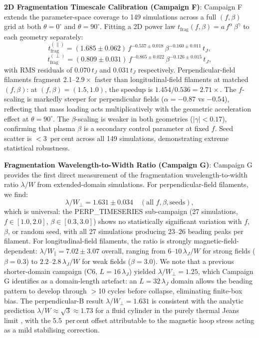 \documentclass[usenatbib]{rasti}
\begin{document}
\textbf{2D Fragmentation Timescale Calibration (Campaign F)}: Campaign F extends the
parameter-space coverage to 149 simulations across a full $(f, \beta)$ grid at both
$\theta = 0^\circ$ and $\theta = 90^\circ$. Fitting a 2D power law
$t_\mathrm{frag}(f, \beta) = a\,f^{\alpha}\,\beta^{\gamma}$ to each geometry separately:
\begin{equation}
t_\mathrm{frag}^{(\parallel)} = (1.685 \pm 0.062)\,f^{-0.537 \pm 0.018}\,\beta^{-0.160 \pm 0.011}\,t_J,
\label{eq:tfrag_para}
\end{equation}
\begin{equation}
t_\mathrm{frag}^{(\perp)} = (0.809 \pm 0.031)\,f^{-0.865 \pm 0.022}\,\beta^{-0.126 \pm 0.015}\,t_J,
\label{eq:tfrag_perp}
\end{equation}
with RMS residuals of $0.070\,t_J$ and $0.031\,t_J$ respectively. Perpendicular-field
filaments fragment 2.1--$2.9\times$ faster than longitudinal-field filaments at matched
$(f, \beta)$: at $(f, \beta) = (1.5, 1.0)$, the speedup is $1.454/0.536 = 2.71\times$. The
$f$-scaling is markedly steeper for perpendicular fields ($\alpha = -0.87$ vs $-0.54$),
reflecting that mass loading acts multiplicatively with the geometric acceleration effect at
$\theta = 90^\circ$. The $\beta$-scaling is weaker in both geometries ($|\gamma| < 0.17$),
confirming that plasma $\beta$ is a secondary control parameter at fixed $f$. Seed
scatter is $< 3$~per\,cent across all 149 simulations, demonstrating extreme statistical
robustness.

\textbf{Fragmentation Wavelength-to-Width Ratio (Campaign G)}: Campaign G provides the
first direct measurement of the fragmentation wavelength-to-width ratio $\lambda/W$ from
extended-domain simulations. For perpendicular-field filaments, we find:
\begin{equation}
\lambda/W_\perp = 1.631 \pm 0.034 \quad (\text{all } f, \beta, \text{seeds}),
\label{eq:lw_perp}
\end{equation}
which is universal: the PERP\_TIMESERIES sub-campaign (27 simulations, $f \in [1.0, 2.0]$,
$\beta \in [0.3, 3.0]$) shows no statistically significant variation with $f$, $\beta$, or
random seed, with all 27 simulations producing $23$--$26$ beading peaks per filament. For
longitudinal-field filaments, the ratio is strongly magnetic-field-dependent:
$\lambda/W_\parallel = 7.02 \pm 3.07$ overall, ranging from $6$--$10\,\lambda_J/W$ for strong
fields ($\beta = 0.3$) to $2.2$--$2.8\,\lambda_J/W$ for weak fields ($\beta = 3.0$). We note that
a previous shorter-domain campaign (C6, $L = 16\,\lambda_J$) yielded $\lambda/W_\perp = 1.25$,
which Campaign G identifies as a domain-length artefact: an $L = 32\,\lambda_J$ domain
allows the beading pattern to develop through $>$10 cycles before collapse, eliminating
finite-box bias. The perpendicular-B result $\lambda/W_\perp = 1.631$ is consistent with
the analytic prediction $\lambda/W \approx \sqrt{3} \approx 1.73$ for a fluid cylinder in
the purely thermal Jeans limit \citep{nagasawa1987}, with the $5.5$~per\,cent offset
attributable to the magnetic hoop stress acting as a mild stabilising correction.
\end{document}
